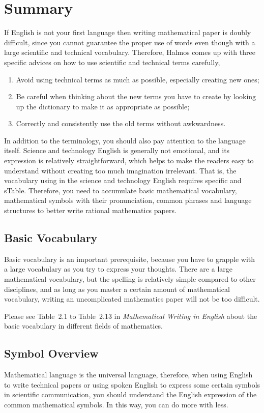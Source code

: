 \section{Summary}
If English is not your first language then writing mathematical paper is doubly difficult, since you cannot guarantee the proper use of words even though with a large scientific and technical vocabulary. Therefore, Halmos comes up with three specific advices on how to use scientific and technical terms carefully,
\begin{enumerate}[label={\Alph*.}]
	\item Avoid using technical terms as much as possible, especially creating new ones;
	\item Be careful when thinking about the new terms you have to create by looking up the dictionary to make it as appropriate as possible;
	\item Correctly and consistently use the old terms without awkwardness.
\end{enumerate}

In addition to the terminology, you should also pay attention to the language itself. Science and technology English is generally not emotional, and its expression is relatively straightforward, which helps to make the readers easy to understand without creating too much imagination irrelevant. That is, the vocabulary using in the science and technology English requires specific and sTable. Therefore, you need to accumulate basic mathematical vocabulary, mathematical symbols with their pronunciation, common phrases and language structures to better write rational mathematics papers.


\subsection{Basic Vocabulary}
Basic vocabulary is an important prerequisite, because you have to grapple with a large vocabulary as you try to express your thoughts. There are a large mathematical vocabulary, but the spelling is relatively simple compared to other disciplines, and as long as you master a certain amount of mathematical vocabulary, writing an uncomplicated mathematics paper will not be too difficult.

Please see Table~2.1 to Table~2.13 in \emph{Mathematical Writing in English}\cite{2013数学之英文写作} about the basic vocabulary in different fields of mathematics.


\subsection{Symbol Overview}
Mathematical language is the universal language, therefore, when using English to write technical papers or using spoken English to express some certain symbols in scientific communication, you should understand the English expression of the common mathematical symbols. In this way, you can do more with less.

